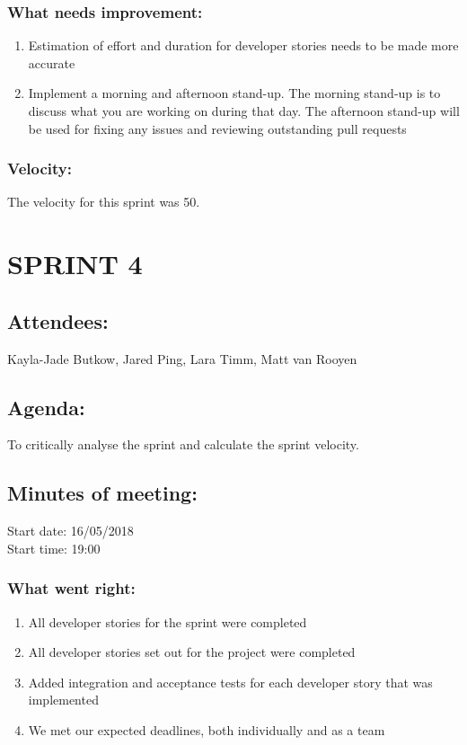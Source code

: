 \documentclass[10pt,onecolumn]{witseiepaper}
\begin{document}
\subsubsection*{What needs improvement:}
\begin{enumerate}
	\item Estimation of effort and duration for developer stories needs to be made more accurate
	\item Implement a morning and afternoon stand-up. The morning stand-up is to discuss what you are working on during that day. The afternoon stand-up will be used for fixing any issues and reviewing outstanding pull requests 
\end{enumerate}

\subsubsection*{Velocity:}
The velocity for this sprint was 50. 

\newpage
\section*{SPRINT 4}

\subsection*{Attendees:}
Kayla-Jade Butkow, Jared Ping, Lara Timm, Matt van Rooyen

\subsection*{Agenda:} 
To critically analyse the sprint and calculate the sprint velocity.

\subsection*{Minutes of meeting:}
Start date: 16/05/2018 \\
Start time: 19:00

\subsubsection*{What went right:}
\begin{enumerate}
	\item All developer stories for the sprint were completed
	\item All developer stories set out for the project were completed
	\item Added integration and acceptance tests for each developer story that was implemented
	\item We met our expected deadlines, both individually and as a team
	
\end{enumerate}
\end{document}
